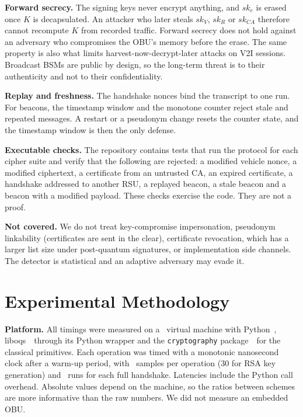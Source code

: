 \documentclass[journal,twoside]{IEEEtran}
\begin{document}
\textbf{Forward secrecy.} The signing keys never encrypt anything, and $sk_e$ is erased once $K$ is decapsulated. An attacker who later steals $sk_V$, $sk_R$ or $sk_{CA}$ therefore cannot recompute $K$ from recorded traffic. Forward secrecy does not hold against an adversary who compromises the OBU's memory before the erase. The same property is also what limits harvest-now-decrypt-later attacks on V2I sessions. Broadcast BSMs are public by design, so the long-term threat is to their authenticity and not to their confidentiality.

\textbf{Replay and freshness.} The handshake nonces bind the transcript to one run. For beacons, the timestamp window and the monotone counter reject stale and repeated messages. A restart or a pseudonym change resets the counter state, and the timestamp window is then the only defense.

\textbf{Executable checks.} The repository contains tests that run the protocol for each cipher suite and verify that the following are rejected: a modified vehicle nonce, a modified ciphertext, a certificate from an untrusted CA, an expired certificate, a handshake addressed to another RSU, a replayed beacon, a stale beacon and a beacon with a modified payload. These checks exercise the code. They are not a proof.

\textbf{Not covered.} We do not treat key-compromise impersonation, pseudonym linkability (certificates are sent in the clear), certificate revocation, which has a larger list size under post-quantum signatures, or implementation side channels. The detector is statistical and an adaptive adversary may evade it.

\section{Experimental Methodology}
\label{sec:method}

\textbf{Platform.} All timings were measured on a \cpuModel\ virtual machine with Python~\pyVer, liboqs~\liboqsVer\ through its Python wrapper and the \texttt{cryptography} package~\cryptoVer\ for the classical primitives. Each operation was timed with a monotonic nanosecond clock after a warm-up period, with \benchN\ samples per operation (30 for RSA key generation) and \hsN\ runs for each full handshake. Latencies include the Python call overhead. Absolute values depend on the machine, so the ratios between schemes are more informative than the raw numbers. We did not measure an embedded OBU.
\end{document}
